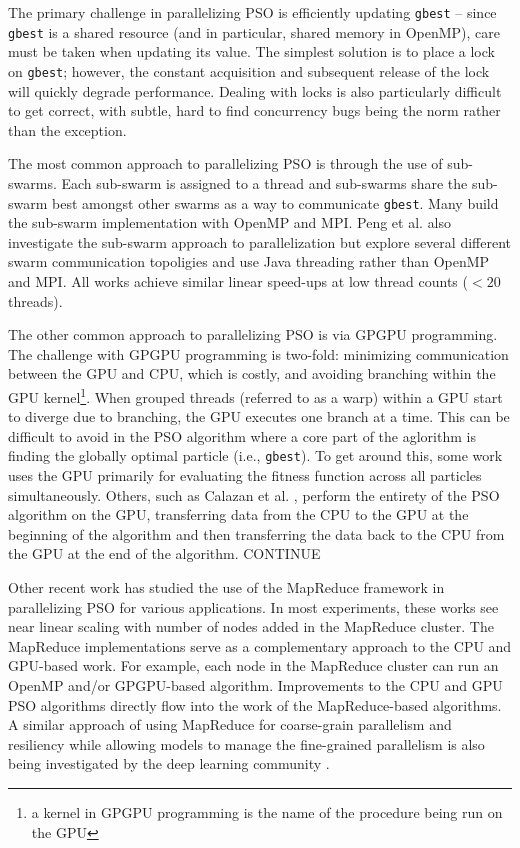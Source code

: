 The primary challenge in parallelizing PSO is efficiently updating
\texttt{gbest} -- since \texttt{gbest} is a shared resource (and in particular,
shared memory in OpenMP), care must be taken when updating its value. The
simplest solution is to place a lock on \texttt{gbest}; however, the constant
acquisition and subsequent release of the lock will quickly degrade
performance. Dealing with locks is also particularly difficult to get correct,
with subtle, hard to find concurrency bugs being the norm rather than the
exception.

The most common approach to parallelizing PSO is through the use of
sub-swarms. Each sub-swarm is assigned to a thread and sub-swarms share the
sub-swarm best amongst other swarms as a way to communicate
\texttt{gbest}. Many \cite{cooppso, comppso, optionpso}
build the sub-swarm implementation with OpenMP and MPI. Peng et
al. \cite{multicore-pso} also investigate the sub-swarm approach to
parallelization but explore several different swarm communication topoligies and
use Java threading rather than OpenMP and MPI. All works achieve similar linear
speed-ups at low thread counts ($<20$ threads).

The other common approach to parallelizing PSO is via GPGPU programming. The
challenge with GPGPU programming is two-fold: minimizing communication between
the GPU and CPU, which is costly, and avoiding branching within the GPU
kernel\footnote{a kernel in GPGPU programming is the name of the procedure being
  run on  the GPU}. When grouped threads (referred to as a warp) within a GPU
start to diverge due to branching, the
GPU executes one branch at a time.
This can be difficult to avoid in the PSO algorithm where a core part
of the aglorithm is finding the globally optimal particle (i.e., \texttt{gbest}).
To get around this,
some work \cite{gpu-ppso, gpu-pso} uses the GPU primarily for evaluating the
fitness function across all particles simultaneously.
Others, such as Calazan et al. \cite{swarmgrid}, perform the entirety of
the PSO algorithm on the GPU, transferring data from the CPU to the GPU at the
beginning of the algorithm and then transferring the data back to the CPU from
the GPU at the end of the algorithm.
CONTINUE \cite{biopsogpu, multiswarmpso-gpu}

Other recent work \cite{mrcpso, mprso, coop-pso, intrusion-pso} has
studied the use of the MapReduce framework \cite{mapreduce} in parallelizing PSO
for various applications. In most experiments, these works see near linear
scaling with number of nodes added in the MapReduce cluster.
The MapReduce implementations serve as a complementary
approach to the CPU and GPU-based work. For example, each node in the MapReduce
cluster can run an OpenMP and/or
GPGPU-based algorithm. Improvements to the CPU and GPU PSO algorithms directly
flow into the work of the MapReduce-based algorithms. A similar approach of using
MapReduce for coarse-grain parallelism and resiliency while allowing
models to manage the fine-grained
parallelism is also being investigated by the deep learning community \cite{mrpnn,
  heterospark, dlspark}. 

